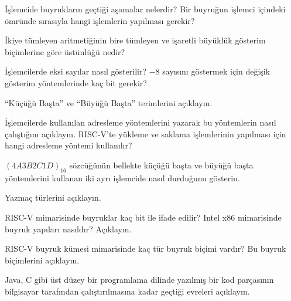 \begin{alistirma}[\kolay]
İşlemcide buyrukların geçtiği aşamalar nelerdir? Bir buyruğun işlemci içindeki ömründe sırasıyla hangi işlemlerin yapılması gerekir?
\end{alistirma}

\begin{alistirma}[\kolay]
İkiye tümleyen aritmetiğinin bire tümleyen ve işaretli büyüklük gösterim biçimlerine göre üstünlüğü nedir?
\end{alistirma}

\begin{alistirma}[\orta]
İşlemcilerde eksi sayılar nasıl gösterilir? $-8$ sayısını göstermek için değişik gösterim yöntemlerinde kaç bit gerekir?
\end{alistirma}

\begin{alistirma}[\kolay]
``Küçüğü Başta'' ve ``Büyüğü Başta'' terimlerini açıklayın.
\end{alistirma}

\begin{alistirma}[\orta]
İşlemcilerde kullanılan adresleme yöntemlerini yazarak bu yöntemlerin nasıl çalıştığını açıklayın. RISC-V'te yükleme ve saklama işlemlerinin yapılması için hangi adresleme yöntemi kullanılır?
\end{alistirma}

\begin{alistirma}[\orta]
$(4A3B2C1D)_{16}$ sözcüğünün bellekte küçüğü başta ve büyüğü başta yöntemlerini kullanan iki ayrı işlemcide nasıl durduğunu gösterin.
\end{alistirma}

\begin{alistirma}[\kolay]
Yazmaç türlerini açıklayın.
\end{alistirma}

\begin{alistirma}[\orta]
RISC-V mimarisinde buyruklar kaç bit ile ifade edilir? Intel x86 mimarisinde buyruk yapıları nasıldır? Açıklayın.
\end{alistirma}

\begin{alistirma}[\orta]
RISC-V buyruk kümesi mimarisinde kaç tür buyruk biçimi vardır? Bu buyruk biçimlerini açıklayın.
\end{alistirma}

\begin{alistirma}[\kolay]
Java, C gibi üst düzey bir programlama dilinde yazılmış bir kod parçasının bilgisayar tarafından çalıştırılmasına kadar geçtiği evreleri açıklayın.
\end{alistirma}

